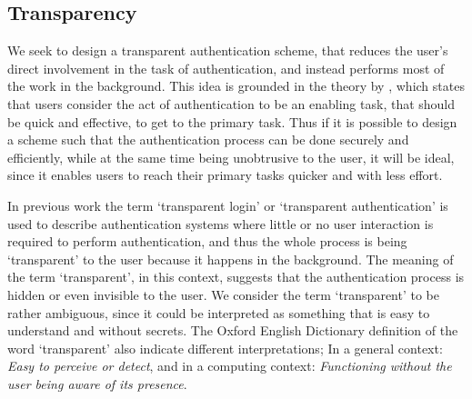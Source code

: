 \subsection{Transparency}
We seek to design a transparent authentication scheme, that reduces the user's direct involvement in the task of authentication, and instead performs most of the work in the background. This idea is grounded in the theory by \citet{weirich2001pretty}, which states that users consider the act of authentication to be an enabling task, that should be quick and effective, to get to the primary task. Thus if it is possible to design a scheme such that the authentication process can be done securely and efficiently, while at the same time being unobtrusive to the user, it will be ideal, since it enables users to reach their primary tasks quicker and with less effort.

In previous work \cite{bianchi2016wearable, ceccarelli2015continuous, ojala2008wearable} the term `transparent login' or `transparent authentication' is used to describe authentication systems where little or no user interaction is required to perform authentication, and thus the whole process is being `transparent' to the user because it happens in the background. The meaning of the term `transparent', in this context, suggests that the authentication process is hidden or even invisible to the user. We consider the term `transparent' to be rather ambiguous, since it could be interpreted as something that is easy to understand and without secrets. The Oxford English Dictionary definition of the word `transparent' also indicate different interpretations; In a general context: \textit{Easy to perceive or detect}, and in a computing context: \textit{Functioning without the user being aware of its presence}.




